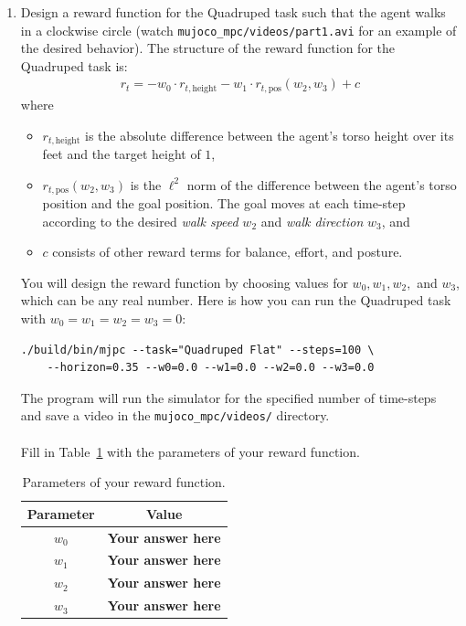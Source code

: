 \documentclass[12pt]{article}
\begin{document}
\begin{enumerate}
\item Design a reward function for the Quadruped task such that the agent walks in a clockwise circle (watch \texttt{mujoco\_mpc/videos/part1.avi} for an example of the desired behavior). The structure of the reward function for the Quadruped task is:
\begin{align*}
    r_t = -w_0 \cdot r_{t, \text{height}} - w_1 \cdot r_{t, \text{pos}}(w_2, w_3) + c
\end{align*}
where
\begin{itemize}
    \item $r_{t, \text{height}}$ is the absolute difference between the agent's torso height over its feet and the target height of $1$,
    \item $r_{t, \text{pos}}(w_2, w_3)$ is the $\ell^2$ norm of the difference between the agent's torso position and the goal position. The goal moves at each time-step according to the desired \emph{walk speed} $w_2$ and \emph{walk direction} $w_3$, and
    \item $c$ consists of other reward terms for balance, effort, and posture.
\end{itemize}

You will design the reward function by choosing values for $w_0, w_1, w_2,$ and $w_3$, which can be any real number. Here is how you can run the Quadruped task with $w_0 = w_1 = w_2 = w_3 = 0$:
\begin{tcolorbox}[width=\linewidth, sharp corners=all, colback=white!95!black]
\begin{verbatim}
./build/bin/mjpc --task="Quadruped Flat" --steps=100 \
    --horizon=0.35 --w0=0.0 --w1=0.0 --w2=0.0 --w3=0.0
\end{verbatim}
\end{tcolorbox}

\vspace{0.2cm}

The program will run the simulator for the specified number of time-steps and save a video in the \texttt{mujoco\_mpc/videos/} directory.
\\
\\
Fill in Table~\ref{table:Problem_1} with the parameters of your reward function.
\begin{table}[h]
\centering
\begin{tabular}{cc}
    \toprule
    Parameter & Value \\
    \midrule
    $w_0$ & \textbf{\color{red}Your answer here} \\
    $w_1$ & \textbf{\color{red}Your answer here} \\
    $w_2$ & \textbf{\color{red}Your answer here} \\
    $w_3$ & \textbf{\color{red}Your answer here} \\
    \bottomrule
\end{tabular}
\label{table:Problem_1}
\caption{Parameters of your reward function.}
\end{table}


\end{enumerate}
\end{document}
